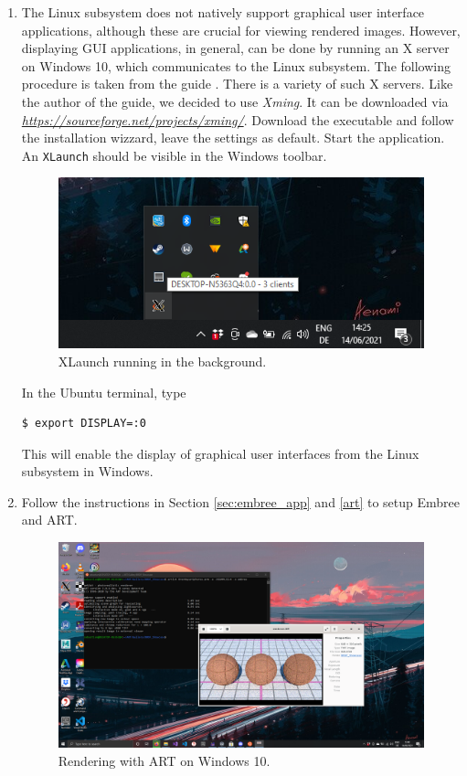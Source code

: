 \begin{enumerate}
	\item The Linux subsystem does not natively support graphical user interface applications, although these are crucial for viewing rendered images. However, displaying GUI applications, in general, can be done by running an X server on Windows 10, which communicates to the Linux subsystem. The following procedure is taken from the guide  \cite{windowsSubsystem}. There is a variety of such X servers. Like the author of the guide, we decided to use \emph{Xming}. It can be downloaded via
	\emph{\href{https://sourceforge.net/projects/xming/}{https://sourceforge.net/projects/xming/}}.
	Download the executable and follow the installation wizzard, leave the settings as default. Start the application. An \texttt{XLaunch} should be visible in the Windows toolbar.
	\begin{figure}[h]
		\centering
		\includegraphics[width=.5\linewidth]{img/appendix/xlaunch.png}
		\caption{XLaunch running in the background.}
		\label{fig:xlaunch}
	\end{figure}  
	
	In the Ubuntu terminal, type
\begin{Verbatim}
$ export DISPLAY=:0
\end{Verbatim}
	This will enable the display of graphical user interfaces from the Linux subsystem in Windows.
	
	
	\item Follow the instructions in Section \ref{sec:embree_app} and \ref{art} to setup Embree and ART.
	
	\begin{figure}[h]
		\centering
		\includegraphics[width=1\linewidth]{img/appendix/final.png}
		\caption{Rendering with ART on Windows 10.}
		\label{fig:final}
	\end{figure}
	
	
\end{enumerate}

